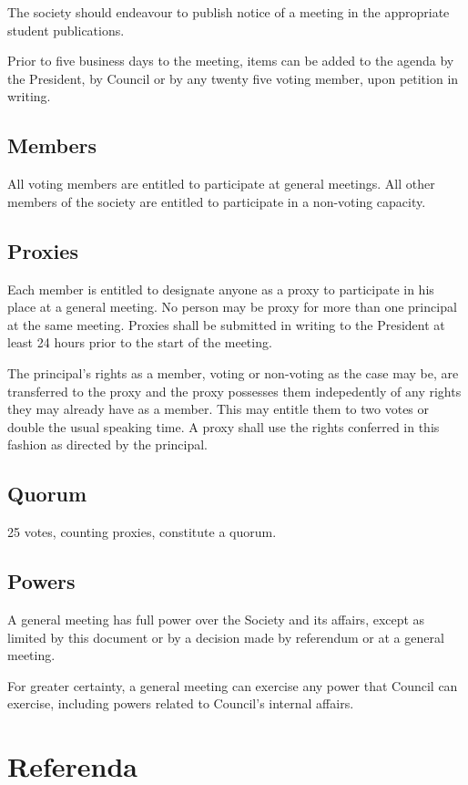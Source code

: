The society should endeavour to publish notice of a meeting in the appropriate student publications.

Prior to five business days to the meeting, items can be added to the agenda by the President, by Council or by any twenty five voting member, upon petition in writing.

\subsection{Members}
All voting members are entitled to participate at general meetings. All other
members of the society are entitled to participate in a non-voting capacity.

\subsection{Proxies}
Each member is entitled to designate anyone as a proxy to participate in his
place at a general meeting. No person may be proxy for more than one principal
at the same meeting. Proxies shall be submitted in writing to the President at
least 24 hours prior to the start of the meeting.

The principal's rights as a member, voting or non-voting as the case may be, are
transferred to the proxy and the proxy possesses them indepedently of any rights
they may already have as a member. This may entitle them to two votes or double
the usual speaking time. A proxy shall use the rights conferred in this fashion
as directed by the principal.

\subsection{Quorum}
25 votes, counting proxies, constitute a quorum.

\subsection{Powers}
A general meeting has full power over the Society and its affairs, except as
limited by this document or by a decision made by referendum or at a general
meeting.

For greater certainty, a general meeting can exercise any power that Council can
exercise, including powers related to Council's internal affairs.

\section{Referenda}
